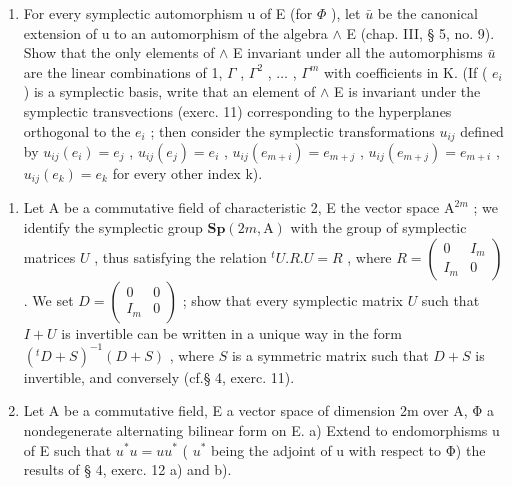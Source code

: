 \begin{enumerate}
\def\labelenumi{\alph{enumi})}
\setcounter{enumi}{6}
\tightlist
\item
  For every symplectic automorphism u of E (for \(\Phi\) ), let \(\bar{u}\) be the canonical extension of u to an automorphism of the algebra \(\wedge\) E (chap. III, § 5, no. 9). Show that the only elements of \(\wedge\) E invariant under all the automorphisms \(\bar{u}\) are the linear combinations of 1, \(\Gamma\) , \(\Gamma^{2}\) , \(\ldots\) , \(\Gamma^{m}\) with coefficients in K. (If ( \(e_{i}\) ) is a symplectic basis, write that an element of \(\wedge\) E is invariant under the symplectic transvections (exerc. 11) corresponding to the hyperplanes orthogonal to the \(e_{i}\) ; then consider the symplectic transformations \(u_{ij}\) defined by \(u_{ij}(e_{i}) = e_{j}\) , \(u_{ij}(e_{j}) = e_{i}\) , \(u_{ij}(e_{m+i}) = e_{m+j}\) , \(u_{ij}(e_{m+j}) = e_{m+i}\) , \(u_{ij}(e_{k}) = e_{k}\) for every other index k).
\end{enumerate}

\begin{enumerate}
\def\labelenumi{\arabic{enumi})}
\setcounter{enumi}{13}
\item
  Let A be a commutative field of characteristic 2, E the vector space \(\mathrm{A}^{2m}\) ; we identify the symplectic group \(\mathbf{Sp}(2m,\mathrm{A})\) with the group of symplectic matrices \(U\) , thus satisfying the relation \(^t U.R.U = R\) , where \(R = \left( \begin{array}{cc}0 & I_m\\ I_m & 0 \end{array} \right)\) . We set \(D = \left( \begin{array}{cc}0 & 0\\ I_m & 0 \end{array} \right)\) ; show that every symplectic matrix \(U\) such that \(I + U\) is invertible can be written in a unique way in the form \((^t D + S)^{-1}(D + S)\) , where \(S\) is a symmetric matrix such that \(D + S\) is invertible, and conversely (cf.§ 4, exerc. 11).
\item
  Let A be a commutative field, E a vector space of dimension 2m over A, Φ a nondegenerate alternating bilinear form on E. a) Extend to endomorphisms u of E such that \(u^{*}u = uu^{*}\) ( \(u^{*}\) being the adjoint of u with respect to Φ) the results of § 4, exerc. 12 a) and b).
\end{enumerate}

